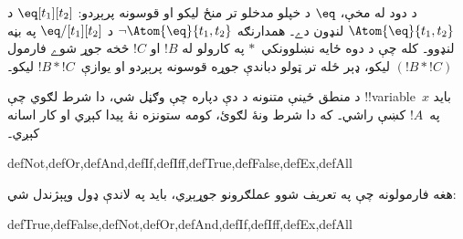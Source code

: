 \documentclass[../../../include/open-logic-section]{subfiles}
\begin{document}
د دود له مخې، $\eq$ د خپلو مدخلو تر منځ ليکو او قوسونه پرېږدو:
$\eq[t_1][t_2]$ د $\Atom{\eq}{t_1,t_2}$ لنډون دے۔ همدارنګه
$\lnot \Atom{\eq}{t_1,t_2}$ د $\eq/[t_1][t_2]$ په بڼه لنډوو۔ کله
چې د دوه ځايه نښلوونکي~$\ast$ په کارولو له $!B$ او $!C$ څخه جوړ
شوے فارمول $(!B \ast !C)$ ليکو، ډېر ځله تر ټولو دباندې جوړه قوسونه
پرېږدو او يوازې~$!B \ast !C$ ليکو۔

\begin{intro}
د منطق ځينې متنونه د دې دپاره چې
%
%
%
وګڼل شي، دا شرط لګوي چې !!{variable}~$x$ بايد په~$!A$ کښې راشي۔
که دا شرط ونۀ لګوئ، کومه ستونزه نۀ پيدا کېږي او کار اسانه کېږي۔
\end{intro}

\begin{tagblock}{defNot,defOr,defAnd,defIf,defIff,defTrue,defFalse,defEx,defAll}
\begin{defn}
هغه فارمولونه چې په تعريف شوو عملګرونو جوړېږي، بايد په لاندې ډول
وپېژندل شي:

\begin{tagenumerate}{defTrue,defFalse,defNot,defOr,defAnd,defIf,defIff,defEx,defAll}









\end{tagenumerate}
\end{defn}
\end{tagblock}
\end{document}
